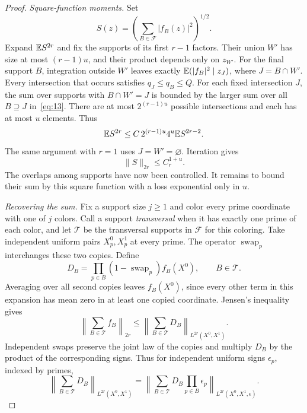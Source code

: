 \begin{proof}
\smallskip
\noindent\emph{Square-function moments.}
Set
\[
 S(z)=\left(\sum_{B\in\mathcal F}|f_B(z)|^2\right)^{1/2}.
\]
Expand \(\mathbb E S^{2r}\) and fix the supports of its first \(r-1\)
factors.  Their union \(W'\) has size at most \((r-1)u\), and their
product depends only on \(z_{W'}\).  For the final support \(B\),
integration outside \(W'\) leaves exactly
\(\mathbb E(|f_B|^2\mid z_J)\), where \(J=B\cap W'\).
Every intersection that occurs satisfies \(q_J\le q_B\le Q\).
For each fixed intersection \(J\), the sum over supports with
\(B\cap W'=J\) is bounded by the larger sum over all \(B\supseteq J\)
in~\eqref{eq:13}.  There are at most \(2^{(r-1)u}\) possible
intersections and each has at most \(u\) elements.  Thus
\[
 \mathbb E S^{2r}\le C\,2^{(r-1)u}4^u\mathbb E S^{2r-2}.
\]
The same argument with \(r=1\) uses \(J=W'=\varnothing\).
Iteration gives
\begin{equation}
 \|S\|_{2r}\le C_r^{1+u}.
 \label{lift:square-function}
\end{equation}
The overlaps among supports have now been controlled.  It remains to
bound their sum by this square function with a loss exponential only in
\(u\).

\smallskip
\noindent\emph{Recovering the sum.}
Fix a support size \(j\ge1\) and color every prime coordinate with one
of \(j\) colors.  Call a support \emph{transversal} when it has exactly
one prime of each color, and let \(\mathcal T\) be the transversal
supports in \(\mathcal F\) for this coloring.  Take independent uniform
pairs \(X_p^0,X_p^1\) at every prime.  The operator
\(\operatorname{swap}_p\) interchanges these two copies.  Define
\[
 D_B=\prod_{p\in B}(1-\operatorname{swap}_p)f_B(X^0),
 \qquad B\in\mathcal T.
\]
Averaging over all second copies leaves \(f_B(X^0)\), since every
other term in this expansion has mean zero in at least one copied
coordinate.  Jensen's inequality gives
\[
 \left\|\sum_{B\in\mathcal T}f_B\right\|_{2r}
 \le\left\|\sum_{B\in\mathcal T}D_B\right\|_{L^{2r}(X^0,X^1)}.
\]
Independent swaps preserve the joint law of the copies and multiply
\(D_B\) by the product of the corresponding signs.  Thus for independent
uniform signs \(\epsilon_p\), indexed by primes,
\[
 \left\|\sum_{B\in\mathcal T}D_B\right\|_{L^{2r}(X^0,X^1)}
 =\left\|\sum_{B\in\mathcal T}D_B\prod_{p\in B}\epsilon_p
       \right\|_{L^{2r}(X^0,X^1,\epsilon)}.
\]


\end{proof}
